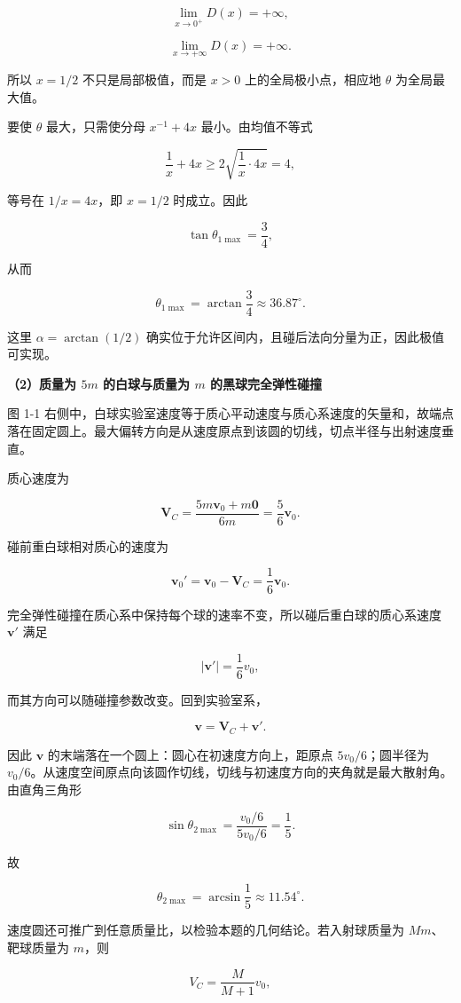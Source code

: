 \documentclass[12pt,a4paper,UTF8]{ctexart}
\begin{document}
\[\lim_{x\to0^+}D(x)=+\infty,\]

\[\lim_{x\to+\infty}D(x)=+\infty.\]

所以 \(x=1/2\) 不只是局部极值，而是 \(x>0\) 上的全局极小点，相应地
\(\theta\) 为全局最大值。

要使 \(\theta\) 最大，只需使分母 \(x^{-1}+4x\) 最小。由均值不等式

\[\frac1x+4x\geq2\sqrt{\frac1x\cdot4x}=4,\]

等号在 \(1/x=4x\)，即 \(x=1/2\) 时成立。因此

\[\tan\theta_{1\max}=\frac34,\]

从而

\[\boxed{\theta_{1\max}=\arctan\frac34\approx36.87^\circ}. \tag{8}\]

这里 \(\alpha=\arctan(1/2)\)
确实位于允许区间内，且碰后法向分量为正，因此极值可实现。

\textbf{（2）质量为 \(5m\) 的白球与质量为 \(m\) 的黑球完全弹性碰撞}

图 1-1
右侧中，白球实验室速度等于质心平动速度与质心系速度的矢量和，故端点落在固定圆上。最大偏转方向是从速度原点到该圆的切线，切点半径与出射速度垂直。

质心速度为

\[\boldsymbol V_C=\frac{5m\boldsymbol v_0+m\boldsymbol 0}{6m}
=\frac56\boldsymbol v_0. \tag{9}\]

碰前重白球相对质心的速度为

\[\boldsymbol v_0'=\boldsymbol v_0-\boldsymbol V_C
=\frac16\boldsymbol v_0.\]

完全弹性碰撞在质心系中保持每个球的速率不变，所以碰后重白球的质心系速度
\(\boldsymbol v'\) 满足

\[|\boldsymbol v'|=\frac16v_0, \tag{10}\]

而其方向可以随碰撞参数改变。回到实验室系，

\[\boldsymbol v=\boldsymbol V_C+\boldsymbol v'.\]

因此 \(\boldsymbol v\) 的末端落在一个圆上：圆心在初速度方向上，距原点
\(5v_0/6\)；圆半径为
\(v_0/6\)。从速度空间原点向该圆作切线，切线与初速度方向的夹角就是最大散射角。由直角三角形

\[\sin\theta_{2\max}
=\frac{v_0/6}{5v_0/6}=\frac15.\]

故

\[\boxed{\theta_{2\max}=\arcsin\frac15\approx11.54^\circ}. \tag{11}\]

速度圆还可推广到任意质量比，以检验本题的几何结论。若入射球质量为
\(Mm\)、靶球质量为 \(m\)，则

\[V_C=\frac{M}{M+1}v_0,\]
\end{document}
